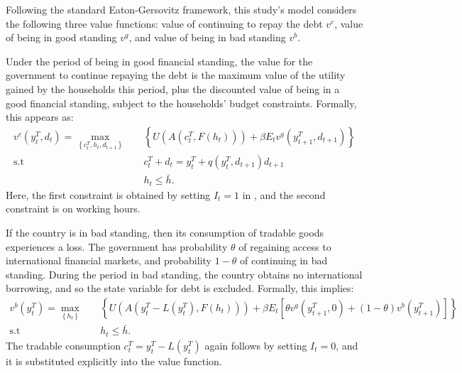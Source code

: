 Following the standard Eaton-Gersovitz framework, this study's model considers the following three value functions:
value of continuing to repay the debt $v^c$, value of being in good standing $v^g$, and value of being in bad standing $v^b$.

Under the period of being in good financial standing, the value for the government to continue repaying the debt is the maximum value of the utility gained by the households this period, plus the discounted value of being in a good financial standing, subject to the households' budget constraints. Formally, this appears as:
\begin{equation}
    \label{eq:vc}
    \begin{aligned}
        v^c(y^T_t, d_t) = \max_{\left\{ c^T_t, h_t, d_{t+1} \right\}} \quad
        &\left\{
            U\left(
                A\left(c^T_t, F(h_t)\right)
             \right)
             + \beta E_t
             v^g \left(
                y^T_{t+1}, d_{t+1}
              \right)
         \right\}\\
          \text{s.t} \quad& c^T_t + d_t = y^T_t + q(y^T_t, d_{t+1}) d_{t+1} \\
                    & h_t \le \bar{h}.
    \end{aligned}
\end{equation}
Here, the first constraint is obtained by setting $I_t = 1$ in , and the second constraint is on working hours.

If the country is in bad standing, then its consumption of tradable goods experiences a loss. The government has probability $\theta$ of regaining access to international financial markets, and probability $1 - \theta$ of continuing in bad standing. During the period in bad standing, the country obtains no international borrowing, and so the state variable for debt is excluded. Formally, this implies:
\begin{equation}
    \label{eq:vb}
    \begin{aligned}
        v^b(y^T_t) = \max_{\left\{ h_t \right\}} \quad
        &\left\{
            U\left(
                A\left( y^T_t - L(y^T_t), F(h_t)\right)
             \right)
             + \beta E_t \left[
                \theta v^g \left(
                    y^T_{t+1}, 0
                \right)
                + (1-\theta) v^b \left(
                    y^{T}_{t+1}
                 \right)
            \right]
         \right\}\\
          \text{s.t} \quad& h_t \le \bar{h}.
    \end{aligned}
\end{equation}
The tradable consumption $c^T_t = y^T_t - L(y^T_t)$ again follows  by setting $I_t = 0$, and it is substituted explicitly into the value function.

